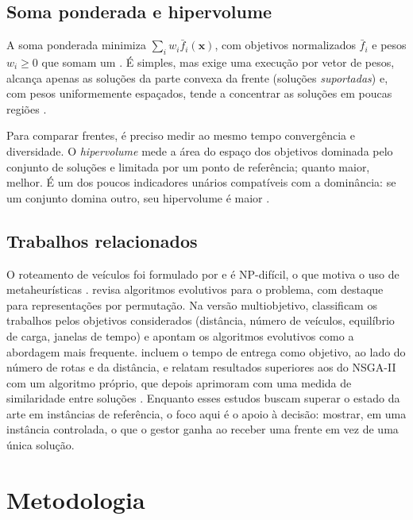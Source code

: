 \documentclass[a4paper,12pt]{article}
\begin{document}
\subsection{Soma ponderada e hipervolume}\label{sec:sp}
\noindent A soma ponderada minimiza $\sum_i w_i \bar{f}_i(\mathbf{x})$, com objetivos normalizados $\bar{f}_i$ e pesos $w_i \ge 0$ que somam um \citep{marler2004}. É simples, mas exige uma execução por vetor de pesos, alcança apenas as soluções da parte convexa da frente (soluções \emph{suportadas}) e, com pesos uniformemente espaçados, tende a concentrar as soluções em poucas regiões \citep{das1997}.

Para comparar frentes, é preciso medir ao mesmo tempo convergência e diversidade. O \emph{hipervolume} \citep{zitzler1999} mede a área do espaço dos objetivos dominada pelo conjunto de soluções e limitada por um ponto de referência; quanto maior, melhor. É um dos poucos indicadores unários compatíveis com a dominância: se um conjunto domina outro, seu hipervolume é maior \citep{zitzler2003}.


\subsection{Trabalhos relacionados}\label{sec:rel}
\noindent O roteamento de veículos foi formulado por \citet{dantzig1959} e é NP-difícil, o que motiva o uso de metaheurísticas \citep{toth2014}. \citet{potvin2009} revisa algoritmos evolutivos para o problema, com destaque para representações por permutação. Na versão multiobjetivo, \citet{jozefowiez2008} classificam os trabalhos pelos objetivos considerados (distância, número de veículos, equilíbrio de carga, janelas de tempo) e apontam os algoritmos evolutivos como a abordagem mais frequente. \citet{garcia2010} incluem o tempo de entrega como objetivo, ao lado do número de rotas e da distância, e relatam resultados superiores aos do NSGA-II com um algoritmo próprio, que depois aprimoram com uma medida de similaridade entre soluções \citep{garcia2011}. Enquanto esses estudos buscam superar o estado da arte em instâncias de referência, o foco aqui é o apoio à decisão: mostrar, em uma instância controlada, o que o gestor ganha ao receber uma frente em vez de uma única solução.


\section{Metodologia}\label{sec:metodo}
\end{document}
